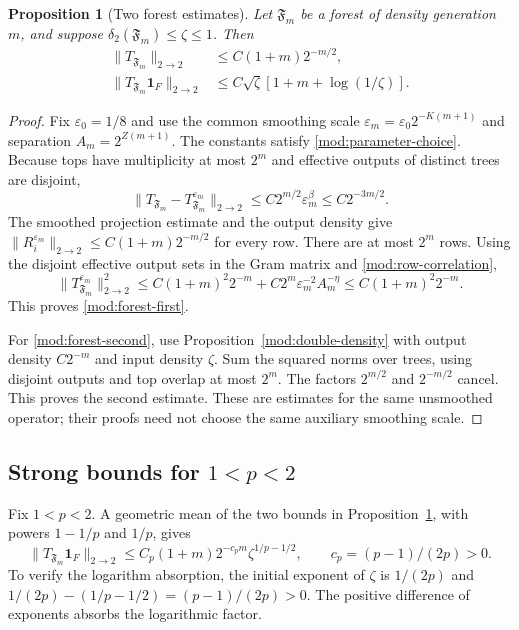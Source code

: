 \documentclass[11pt]{article}
\numberwithin{equation}{section}
\newtheorem{proposition}[theorem]{Proposition}
\theoremstyle{remark}
\theoremstyle{definition}
\begin{document}
\begin{proposition}[Two forest estimates]\label{mod:forest}
Let $\mathfrak F_m$ be a forest of density generation $m$, and suppose
$\delta_2(\mathfrak F_m)\le\zeta\le1$. Then
\begin{align}
 \|T_{\mathfrak F_m}\|_{2\to2}
 &\le C(1+m)2^{-m/2},\label{mod:forest-first}\\
 \|T_{\mathfrak F_m}\mathbf1_F\|_{2\to2}
 &\le C\sqrt\zeta[1+m+\log(1/\zeta)].\label{mod:forest-second}
\end{align}
\end{proposition}
\begin{proof}
Fix $\varepsilon_0=1/8$ and use the common smoothing scale
$\varepsilon_m=\varepsilon_0 2^{-K(m+1)}$ and separation
$A_m=2^{Z(m+1)}$. The constants satisfy
\eqref{mod:parameter-choice}. Because tops have multiplicity at most
$2^m$ and effective outputs of distinct trees are disjoint,
\[
 \|T_{\mathfrak F_m}-T_{\mathfrak F_m}^{\varepsilon_m}\|_{2\to2}
 \le C2^{m/2}\varepsilon_m^\beta\le C2^{-3m/2}.
\]
The smoothed projection estimate and the output density give
$\|R_i^{\varepsilon_m}\|_{2\to2}
\le C(1+m)2^{-m/2}$ for every row. There are at most $2^m$ rows.
Using the disjoint effective output sets in the Gram matrix and
\eqref{mod:row-correlation},
\[
 \|T_{\mathfrak F_m}^{\varepsilon_m}\|_{2\to2}^2
 \le C(1+m)^2 2^{-m}
       +C2^m\varepsilon_m^{-2}A_m^{-\eta}
 \le C(1+m)^2 2^{-m}.
\]
This proves \eqref{mod:forest-first}.

For \eqref{mod:forest-second}, use
Proposition~\ref{mod:double-density} with output density $C2^{-m}$ and
input density $\zeta$. Sum the squared norms over trees, using disjoint
outputs and top overlap at most $2^m$. The factors $2^{m/2}$ and
$2^{-m/2}$ cancel. This proves the second estimate. These are estimates
for the same unsmoothed operator; their proofs need not choose the same
auxiliary smoothing scale.
\end{proof}

\subsection{Strong bounds for \texorpdfstring{$1<p<2$}{1<p<2}}
Fix $1<p<2$. A geometric mean of the two bounds in
Proposition~\ref{mod:forest}, with powers $1-1/p$ and $1/p$, gives
\begin{equation}\label{mod:forest-lowp}
 \|T_{\mathfrak F_m}\mathbf1_F\|_{2\to2}
 \le C_p(1+m)2^{-c_pm}\zeta^{1/p-1/2},
 \qquad c_p=(p-1)/(2p)>0.
\end{equation}
To verify the logarithm absorption, the initial exponent of $\zeta$ is
$1/(2p)$ and
$1/(2p)-(1/p-1/2)=(p-1)/(2p)>0$.
The positive difference of exponents absorbs the logarithmic factor.
\end{document}
